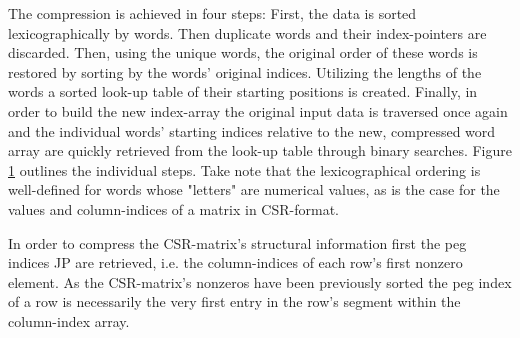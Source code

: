     The compression is achieved in four steps: First, the data is sorted lexicographically by words. Then duplicate
    words and their index-pointers are discarded. Then, using the unique words, the original order of these words is
    restored by sorting by the words' original indices. Utilizing the lengths of the words a sorted look-up table of
    their starting positions is created. Finally, in order to build the new index-array the original input data is
    traversed once again and the individual words' starting indices relative to the new, compressed word array are
    quickly retrieved from the look-up table through binary searches. Figure \ref{fig:c3sr-compression-scheme} outlines
    the individual steps. Take note that the lexicographical ordering is well-defined for words whose "letters" are
    numerical values, as is the case for the values and column-indices of a matrix in CSR-format.

    \begin{figure}[H]
      \centering
      \captionsetup{width=0.9\columnwidth}
      
      \label{fig:c3sr-compression-scheme}
    \end{figure}

    In order to compress the CSR-matrix's structural information first the peg indices JP are retrieved, i.e. the
    column-indices of each row's first nonzero element. As the CSR-matrix's nonzeros have been previously sorted the peg
    index of a row is necessarily the very first entry in the row's segment within the column-index array.

